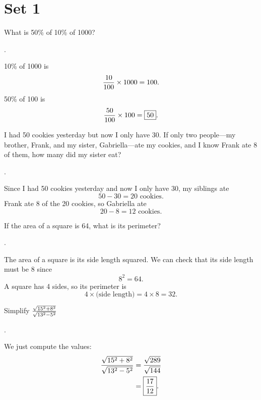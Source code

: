 \documentclass[11pt]{article}
\DeclareRobustCommand{\frac}[3][0pt]{%
  {\begingroup\hspace{#1}#2\hspace{#1}\endgroup\over\hspace{#1}#3\hspace{#1}}}
\begin{document}
\section*{Set 1}

\begin{problem}
What is 50\% of 10\% of 1000?
\end{problem}
\begin{answer}
.
\end{answer}
\begin{solution}
10\% of 1000 is
$$\frac{10}{100} \times 1000 = 100.$$
50\% of 100 is
$$\frac{50}{100} \times 100 = \boxed{50}.$$
\end{solution}

\begin{problem}
I had 50 cookies yesterday but now I only have 30. If only two people---my brother, Frank, and my sister, Gabriella---ate my cookies, and I know Frank ate 8 of them, how many did my sister eat?
\end{problem}
\begin{answer}
.
\end{answer}
\begin{solution}
Since I had 50 cookies yesterday and now I only have 30, my siblings ate
$$50-30 = 20 \text{ cookies}.$$
Frank ate 8 of the 20 cookies, so Gabriella ate
$$20-8=\boxed{12} \text{ cookies}.$$
\end{solution}

\begin{problem}
If the area of a square is 64, what is its perimeter?
\end{problem}
\begin{answer}
.
\end{answer}
\begin{solution}
The area of a square is its side length squared. We can check that its side length must be 8 since
$$8^2 = 64.$$
A square has 4 sides, so its perimeter is
$$4 \times \text{(side length)} = 4 \times 8 = \boxed{32}.$$
\end{solution}


\begin{problem}
Simplify $\frac{\sqrt{15^2+8^2}}{\sqrt{13^2-5^2}}$
\end{problem}
\begin{answer}
 \boxed{\frac{17}{12}}.
\end{answer}
\begin{solution}
We just compute the values:
\begin{align*}
\frac{\sqrt{15^2+8^2}}{\sqrt{13^2-5^2}} &= \frac{\sqrt{289}}{\sqrt{144}} \\
                    	&= \boxed{\frac{17}{12}}.
\end{align*}
\end{solution}
\end{document}

